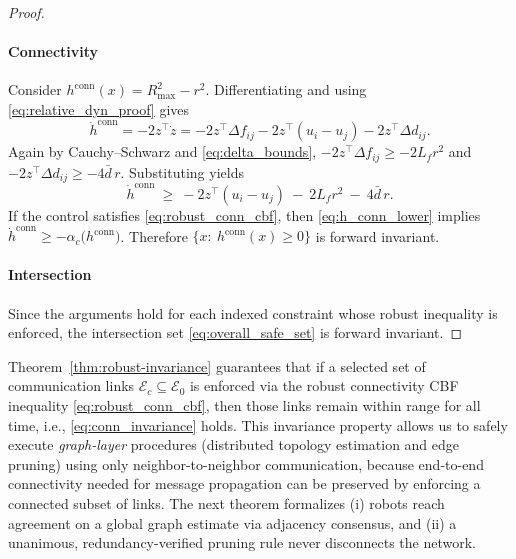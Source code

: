 \documentclass[conference]{IEEEconf}
\theoremstyle{plain}
\begin{document}
\begin{proof}
\paragraph{Connectivity}
Consider $h^{\mathrm{conn}}(x)=R_{\max}^2-r^2$. Differentiating and using \eqref{eq:relative_dyn_proof} gives
\begin{equation}
\dot h^{\mathrm{conn}}
= -2 z^\top \dot z
= -2 z^\top \Delta f_{ij} - 2 z^\top (u_i-u_j) - 2 z^\top \Delta d_{ij}.
\label{eq:h_conn_dot}
\end{equation}
Again by Cauchy--Schwarz and \eqref{eq:delta_bounds},
$-2 z^\top \Delta f_{ij}\ge -2L_f r^2$ and $-2 z^\top \Delta d_{ij}\ge -4\bar d\,r$.
Substituting yields
\begin{equation}
\dot h^{\mathrm{conn}}
\ \ge\
-2 z^\top (u_i-u_j)\ -\ 2L_f r^2\ -\ 4\bar d\, r.
\label{eq:h_conn_lower}
\end{equation}
If the control satisfies \eqref{eq:robust_conn_cbf}, then \eqref{eq:h_conn_lower} implies
$\dot h^{\mathrm{conn}} \ge -\alpha_c\big(h^{\mathrm{conn}}\big)$.
Therefore $\{x:\ h^{\mathrm{conn}}(x)\ge 0\}$ is forward invariant.

\paragraph{Intersection}
Since the arguments hold for each indexed constraint whose robust inequality is enforced, the intersection set \eqref{eq:overall_safe_set} is forward invariant.
\end{proof}

Theorem~\ref{thm:robust-invariance} guarantees that if a selected set of communication links
$\mathcal{E}_c\subseteq \mathcal{E}_0$ is enforced via the robust connectivity CBF inequality
\eqref{eq:robust_conn_cbf}, then those links remain within range for all time, i.e.,
\eqref{eq:conn_invariance} holds. This invariance property allows us to safely execute
\emph{graph-layer} procedures (distributed topology estimation and edge pruning) using only neighbor-to-neighbor
communication, because end-to-end connectivity needed for message propagation can be preserved by enforcing a
connected subset of links. The next theorem formalizes (i) robots reach agreement on a global graph estimate
via adjacency consensus, and (ii) a unanimous, redundancy-verified pruning rule never disconnects the network.

\end{document}
